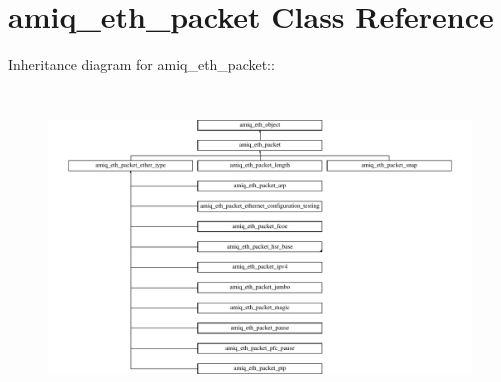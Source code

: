 \hypertarget{classamiq__eth__packet}{
\section{amiq\_\-eth\_\-packet Class Reference}
\label{classamiq__eth__packet}
}
Inheritance diagram for amiq\_\-eth\_\-packet::\begin{figure}[H]
\begin{center}
\leavevmode
\includegraphics[height=8.36782cm]{classamiq__eth__packet}
\end{center}
\end{figure}
